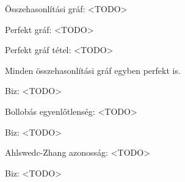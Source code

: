\begin{dfn} Összehasonlítási gráf:
<TODO>
\end{dfn}

\begin{dfn} Perfekt gráf:
<TODO>
\end{dfn}

\begin{thm} Perfekt gráf tétel:
<TODO>
\end{thm}

\begin{thm}
  Minden összehasonlítási gráf egyben perfekt is.
\end{thm}

Biz: <TODO>

\begin{thm} Bollobás egyenlőtlenség:
  <TODO>
\end{thm}

Biz: <TODO>

\begin{thm} Ahlswedc-Zhang azonosság:
  <TODO>
\end{thm}

Biz: <TODO>
